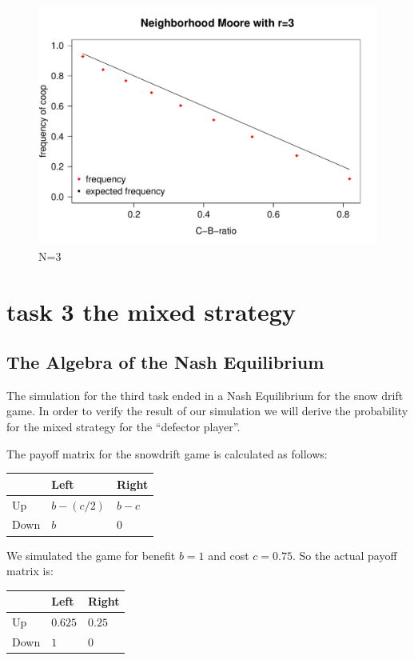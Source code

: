\documentclass[DIV=calc, paper=a4, fontsize=11pt, twocolumn]{scrartcl}	 %
\begin{document}
\begin{figure}[here]
\begin{minipage}{.40\textwidth}
  \centering
  \includegraphics[width=1\linewidth]{HDm3}
 \caption{N=3}
\label{fig:HDm3}
\end{minipage}%
\end{figure}

\section*{task 3 the mixed strategy}



\subsection*{The Algebra of the Nash Equilibrium}

The simulation for the third task ended in a Nash Equilibrium
for the snow drift game. In order to verify the result of our
simulation we will derive the probability for the mixed strategy
for the ``defector player''.


The payoff matrix for the snowdrift game is calculated as follows:

\begin{tabular}{l|ll}
  & Left & Right \\
\midrule
Up & $b-(c/2)$ & $b-c$ \\
Down & $b$ & $0$ \\
\end{tabular}

We simulated the game for benefit $b=1$ and cost $c=0.75$.
So the actual payoff matrix is:

\begin{tabular}{l|ll}
  & Left & Right \\
\midrule
Up & $0.625$ & $0.25$ \\
Down & $1$ & $0$ \\
\end{tabular}
\end{document}
